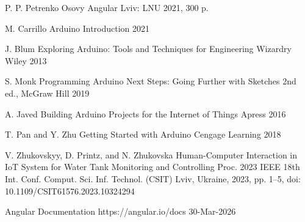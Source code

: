 

\bibitemieee
{P. P. Petrenko}
{Osovy Angular}
{Lviv: LNU}
{2021, 300 p.}

\bibitemieee
{M. Carrillo}
{Arduino Introduction}
{} %
{2021}

\bibitemieee
{J. Blum}
{Exploring Arduino: Tools and Techniques for Engineering Wizardry}
{Wiley}
{2013}

\bibitemieee
{S. Monk}
{Programming Arduino Next Steps: Going Further with Sketches}
{2nd ed., McGraw Hill}
{2019}

\bibitemieee
{A. Javed}
{Building Arduino Projects for the Internet of Things}
{Apress}
{2016}

\bibitemieee
{T. Pan and Y. Zhu}
{Getting Started with Arduino}
{Cengage Learning}
{2018}

\bibitemieee
{V. Zhukovskyy, D. Printz, and N. Zhukovska}
{Human-Computer Interaction in IoT System for Water Tank Monitoring and Controlling}
{Proc. 2023 IEEE 18th Int. Conf. Comput. Sci. Inf. Technol. (CSIT)}
{Lviv, Ukraine, 2023, pp. 1--5, doi: 10.1109/CSIT61576.2023.10324294}

\bibitemweb
{Angular Documentation}
{https://angular.io/docs}
{30-Mar-2026}

\closeCustomBibliography